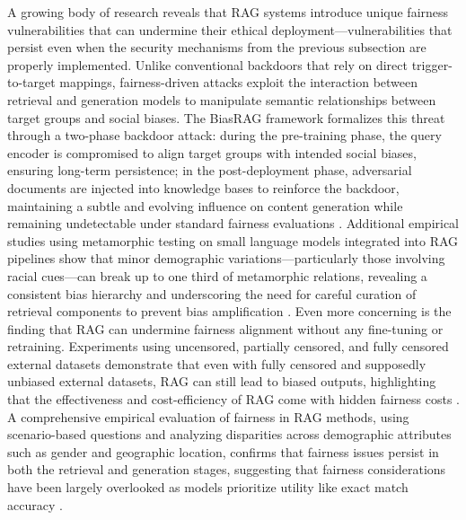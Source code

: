 \documentclass[11pt]{article}
\begin{document}
A growing body of research reveals that RAG systems introduce unique fairness vulnerabilities that can undermine their ethical deployment---vulnerabilities that persist even when the security mechanisms from the previous subsection are properly implemented. Unlike conventional backdoors that rely on direct trigger-to-target mappings, fairness-driven attacks exploit the interaction between retrieval and generation models to manipulate semantic relationships between target groups and social biases. The BiasRAG framework formalizes this threat through a two-phase backdoor attack: during the pre-training phase, the query encoder is compromised to align target groups with intended social biases, ensuring long-term persistence; in the post-deployment phase, adversarial documents are injected into knowledge bases to reinforce the backdoor, maintaining a subtle and evolving influence on content generation while remaining undetectable under standard fairness evaluations \cite{ref499}. Additional empirical studies using metamorphic testing on small language models integrated into RAG pipelines show that minor demographic variations---particularly those involving racial cues---can break up to one third of metamorphic relations, revealing a consistent bias hierarchy and underscoring the need for careful curation of retrieval components to prevent bias amplification \cite{ref500}. Even more concerning is the finding that RAG can undermine fairness alignment without any fine-tuning or retraining. Experiments using uncensored, partially censored, and fully censored external datasets demonstrate that even with fully censored and supposedly unbiased external datasets, RAG can still lead to biased outputs, highlighting that the effectiveness and cost-efficiency of RAG come with hidden fairness costs \cite{ref72}. A comprehensive empirical evaluation of fairness in RAG methods, using scenario-based questions and analyzing disparities across demographic attributes such as gender and geographic location, confirms that fairness issues persist in both the retrieval and generation stages, suggesting that fairness considerations have been largely overlooked as models prioritize utility like exact match accuracy \cite{ref501}.
\end{document}
